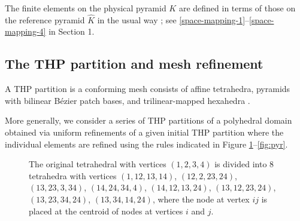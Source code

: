 \documentclass[twoside,reqno,final]{amsart}
\renewcommand{\b}[1]{{\boldsymbol{#1}}}
\begin{document}
The finite elements on the physical pyramid $K$ are defined 
in terms of those on the reference pyramid $\widehat K$ in the usual way \cite{Monk03}; 
see \eqref{space-mapping-1}--\eqref{space-mapping-4} in Section 1.
\subsection{The {\sf THP} partition and mesh refinement}
A {\sf THP} partition
is a conforming mesh consists of affine tetrahedra, pyramids with bilinear B\'ezier patch bases, and trilinear-mapped hexahedra
\cite[Definition 2.3]{AinsworthDavydovSchumaker16}. 

More generally, 
we consider a series of {\sf THP} partitions of a polyhedral domain obtained via uniform refinements of a given initial 
 {\sf THP} partition where the individual elements are refined using the rules indicated in Figure \ref{fig:tet}--\ref{fig:pyr}.


\begin{figure}[!ht]
\centerline{
}
\caption{
The original tetrahedral with vertices $(1,2,3,4)$ is divided into
8 tetrahedra with vertices
$(1,12,13,14)$,  
$(12,2,23,24)$, $(13,23,3,34)$,
$(14,24,34,4)$, $(14,12,13,24)$, $(13,12,23,24)$, $(13,23,34,24)$, 
$(13,34,14,24)$, where 
the node at vertex $ij$ is placed at the centroid of 
nodes at  vertices $i$ and $j$.
}
\label{fig:tet}
\end{figure}
\end{document}
